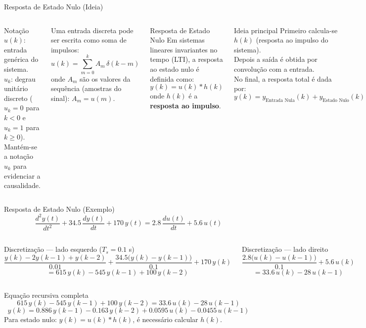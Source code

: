 \begin{frame}{Resposta de Estado Nulo (Ideia)}
  \scriptsize
  \begin{columns}[t]
    \begin{alertblock}{Notação}
      $u(k)$: entrada genérica do sistema.\\
      $u_k$: degrau unitário discreto ($u_k=0$ para $k<0$ e $u_k=1$ para $k\geq 0$).\\
      Mantém-se a notação $u_k$ para evidenciar a causalidade.
    \end{alertblock}
    Uma entrada discreta pode ser escrita como soma de impulsos:
    $$u(k)=\sum_{m=0}^{k} A_m\,\delta(k-m)$$
    onde $A_m$ são os valores da sequência (amostras do sinal): $A_m = u(m)$.
    \begin{block}{Resposta de Estado Nulo}
      Em sistemas lineares invariantes no tempo (LTI), a resposta ao estado nulo é definida como:
      $$y(k)=u(k)*h(k)$$
      onde $h(k)$ é a \textbf{resposta ao impulso}.
    \end{block}
    \begin{block}{Ideia principal}
      Primeiro calcula-se $h(k)$ (resposta ao impulso do sistema). \\
      Depois a saída é obtida por convolução com a entrada. \\
      No final, a resposta total é dada por:
      $$y(k)=y_{\text{Entrada Nula}}(k)+y_{\text{Estado Nulo}}(k)$$
    \end{block}
  \end{columns}
\end{frame}

\begin{frame}{Resposta de Estado Nulo (Exemplo)}
  \scriptsize
  $$\frac{d^2 y(t)}{dt^2}+34.5\,\frac{d y(t)}{dt}+170\,y(t)=2.8\,\frac{d u(t)}{dt}+5.6\,u(t)$$
  \begin{columns}[t]
    \begin{block}{Discretização — lado esquerdo ($T_s=0.1$ s)}
      $$\frac{y(k)-2y(k-1)+y(k-2)}{0.01}+\frac{34.5\bigl(y(k)-y(k-1)\bigr)}{0.1}+170\,y(k)$$
      $$=615\,y(k)-545\,y(k-1)+100\,y(k-2)$$
    \end{block}
    \begin{block}{Discretização — lado direito}
      $$\frac{2.8\bigl(u(k)-u(k-1)\bigr)}{0.1}+5.6\,u(k)$$
      $$=33.6\,u(k)-28\,u(k-1)$$
    \end{block}
  \end{columns}
  \begin{block}{Equação recursiva completa}
    $$615\,y(k)-545\,y(k-1)+100\,y(k-2)=33.6\,u(k)-28\,u(k-1)$$
    $$\boxed{y(k)=0.886\,y(k-1)-0.163\,y(k-2)+0.0595\,u(k)-0.0455\,u(k-1)}$$
    Para estado nulo: $y(k)=u(k)*h(k)$, é necessário calcular $h(k)$.
  \end{block}
\end{frame}

